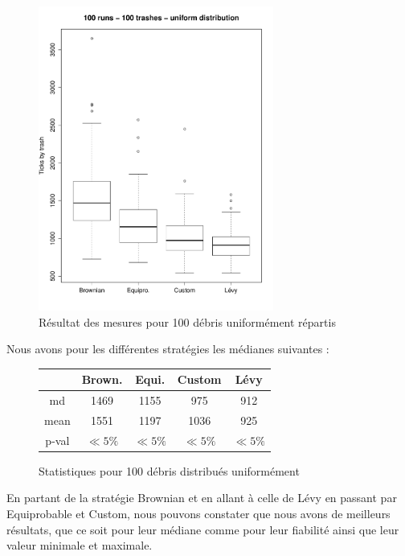 
\begin{figure}[H]
	\begin{center}
		\includegraphics[height=10cm]{diagrams/100TrRnd_all.pdf}
		\caption{Résultat des mesures pour 100 débris uniformément répartis}
		\label{fig:100Trashes_Rnd}
	\end{center}
\end{figure}

Nous avons pour les différentes stratégies les médianes suivantes :

\begin{figure}[H]
	\begin{center}
		\begin{tabular}{| c || c | c | c | c | }
			\hline
			&Brown.&Equi.&Custom&Lévy \\
			\hline
			\hline
			md&1469&1155&975&912\\
			mean&1551&1197&1036&925\\
			p-val&$\ll 5\%$&$\ll 5\%$&$\ll 5\%$&$\ll 5\%$\\
			\hline
		\end{tabular}
		\caption{Statistiques pour 100 débris distribués uniformément}
	\end{center}
\end{figure}

En partant de la stratégie Brownian et en allant à celle de Lévy
en passant par Equiprobable et Custom, nous pouvons constater
que nous avons de meilleurs résultats, que ce soit pour leur médiane
comme pour leur fiabilité ainsi que leur valeur minimale et maximale.
